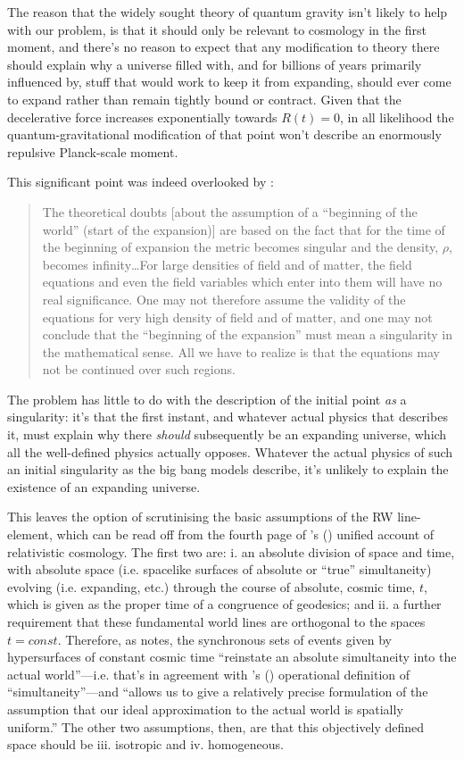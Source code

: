 \documentclass[12 pt]{article}
\def\citeapos#1{\citeauthor{#1}'s (\citeyear{#1})}
\begin{document}
The reason that the widely sought theory of quantum gravity isn't likely to help with our problem, is that it should only be relevant to cosmology in the first moment, and there's no reason to expect that any modification to theory there should explain why a universe filled with, and for billions of years primarily influenced by, stuff that would work to keep it from expanding, should ever come to expand rather than remain tightly bound or contract. Given that the decelerative force increases exponentially towards $R(t)=0$, in all likelihood the quantum-gravitational modification of that point won't describe an enormously repulsive Planck-scale moment.

This significant point was indeed overlooked by \citet{Einstein1945}:
\begin{quotation}
The theoretical doubts [about the assumption of a ``beginning of the world'' (start of the expansion)] are based on the fact that for the time of the beginning of expansion the metric becomes singular and the density, $\rho$, becomes infinity\ldots For large densities of field and of matter, the field equations and even the field variables which enter into them will have no real significance. One may not therefore assume the validity of the equations for very high density of field and of matter, and one may not conclude that the ``beginning of the expansion'' must mean a singularity in the mathematical sense. All we have to realize is that the equations may not be continued over such regions.
\end{quotation}
The problem has little to do with the description of the initial point \textit{as} a singularity: it's that the first instant, and whatever actual physics that describes it, must explain why there \textit{should} subsequently be an expanding universe, which all the well-defined physics actually opposes. Whatever the actual physics of such an initial singularity as the big bang models describe, it's unlikely to explain the existence of an expanding universe.

This leaves the option of scrutinising the basic assumptions of the RW line-element, which can be read off from the fourth page of \citeapos{Robertson1933} unified account of relativistic cosmology. The first two are: i. an absolute division of space and time, with absolute space (i.e. spacelike surfaces of absolute or ``true'' simultaneity) evolving (i.e. expanding, etc.) through the course of absolute, cosmic time, $t$, which is given as the proper time of a congruence of geodesics; and ii. a further requirement that these fundamental world lines are orthogonal to the spaces $t=const.$ Therefore, as \citet{Robertson1933} notes, the synchronous sets of events given by hypersurfaces of constant cosmic time ``reinstate an absolute simultaneity into the actual world''---i.e. that's in agreement with \citeapos{Einstein1905} operational definition of ``simultaneity''---and ``allows us to give a relatively precise formulation of the assumption that our ideal approximation to the actual world is spatially uniform.'' The other two assumptions, then, are that this objectively defined space should be iii. isotropic and iv. homogeneous.
\end{document}
